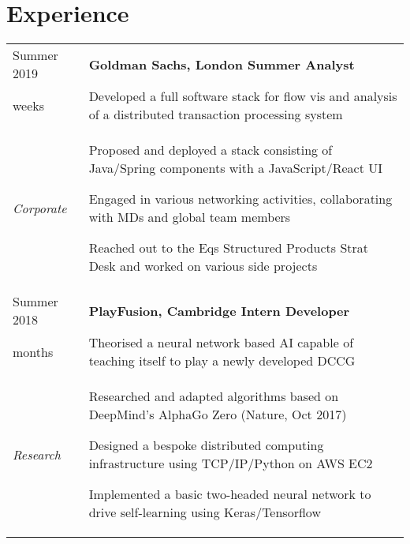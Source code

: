 \documentclass[letterpaper, 10pt]{article}
\begin{document}

\section*{Experience}
\begin{tabularx}{\linewidth}{>{\raggedleft}p{2.2cm}|X}
Summer 2019 & \textbf{Goldman Sachs, London \hfill Summer Analyst }\\
10 weeks & Developed a full software stack for flow vis and analysis of a distributed transaction processing system\\
\textit{Corporate} &
\vspace{-.5\baselineskip}
\begin{compact}
	\item Proposed and deployed a stack consisting of Java/Spring components with a JavaScript/React UI
	\item Engaged in various networking activities, collaborating with MDs and global team members
	\item Reached out to the Eqs Structured Products Strat Desk and worked on various side projects
	\vspace{-.5\baselineskip}
\end{compact}\\
Summer 2018 & \textbf{PlayFusion, Cambridge \hfill Intern Developer}\\
3 months & Theorised a neural network based AI capable of teaching itself to play a newly developed DCCG\\
\textit{Research} &
\vspace{-.5\baselineskip}
\begin{compact}
	\item Researched and adapted algorithms based on DeepMind's AlphaGo Zero (Nature, Oct 2017)
	\item Designed a bespoke distributed computing infrastructure using TCP/IP/Python on AWS EC2
	\item Implemented a basic two-headed neural network to drive self-learning using Keras/Tensorflow

\end{compact}
\end{tabularx}
\end{document}
